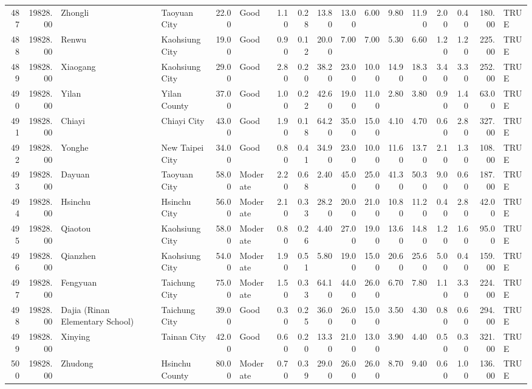\begin{table}[ht]
\begin{tabular}{rrllrlrrrrrrrrrrl}
  487 & 19828.00 & Zhongli & Taoyuan City & 22.00 & Good & 1.10 & 0.28 & 13.80 & 13.00 & 6.00 & 9.80 & 11.90 & 2.00 & 0.40 & 180.00 & TRUE \\ 
  488 & 19828.00 & Renwu & Kaohsiung City & 19.00 & Good & 0.90 & 0.12 & 20.00 & 7.00 & 7.00 & 5.30 & 6.60 & 1.20 & 1.20 & 225.00 & TRUE \\ 
  489 & 19828.00 & Xiaogang & Kaohsiung City & 29.00 & Good & 2.80 & 0.20 & 38.20 & 23.00 & 10.00 & 14.90 & 18.30 & 3.40 & 3.30 & 252.00 & TRUE \\ 
  490 & 19828.00 & Yilan & Yilan County & 37.00 & Good & 1.00 & 0.22 & 42.60 & 19.00 & 11.00 & 2.80 & 3.80 & 0.90 & 1.40 & 63.00 & TRUE \\ 
  491 & 19828.00 & Chiayi & Chiayi City & 43.00 & Good & 1.90 & 0.18 & 64.20 & 35.00 & 15.00 & 4.10 & 4.70 & 0.60 & 2.80 & 327.00 & TRUE \\ 
  492 & 19828.00 & Yonghe & New Taipei City & 34.00 & Good & 0.80 & 0.41 & 34.90 & 23.00 & 10.00 & 11.60 & 13.70 & 2.10 & 1.30 & 108.00 & TRUE \\ 
  493 & 19828.00 & Dayuan & Taoyuan City & 58.00 & Moderate & 2.20 & 0.68 & 2.40 & 45.00 & 25.00 & 41.30 & 50.30 & 9.00 & 0.60 & 187.00 & TRUE \\ 
  494 & 19828.00 & Hsinchu & Hsinchu City & 56.00 & Moderate & 2.10 & 0.33 & 28.20 & 20.00 & 21.00 & 10.80 & 11.20 & 0.40 & 2.80 & 42.00 & TRUE \\ 
  495 & 19828.00 & Qiaotou & Kaohsiung City & 58.00 & Moderate & 0.80 & 0.26 & 4.40 & 27.00 & 19.00 & 13.60 & 14.80 & 1.20 & 1.60 & 95.00 & TRUE \\ 
  496 & 19828.00 & Qianzhen & Kaohsiung City & 54.00 & Moderate & 1.90 & 0.51 & 5.80 & 19.00 & 15.00 & 20.60 & 25.60 & 5.00 & 0.40 & 159.00 & TRUE \\ 
  497 & 19828.00 & Fengyuan & Taichung City & 75.00 & Moderate & 1.50 & 0.33 & 64.10 & 44.00 & 26.00 & 6.70 & 7.80 & 1.10 & 3.30 & 224.00 & TRUE \\ 
  498 & 19828.00 & Dajia (Rinan Elementary School) & Taichung City & 39.00 & Good & 0.30 & 0.25 & 36.00 & 26.00 & 15.00 & 3.50 & 4.30 & 0.80 & 0.60 & 294.00 & TRUE \\ 
  499 & 19828.00 & Xinying & Tainan City & 42.00 & Good & 0.60 & 0.20 & 13.30 & 21.00 & 13.00 & 3.90 & 4.40 & 0.50 & 0.30 & 321.00 & TRUE \\ 
  500 & 19828.00 & Zhudong & Hsinchu County & 80.00 & Moderate & 0.70 & 0.39 & 29.00 & 26.00 & 26.00 & 8.70 & 9.40 & 0.60 & 1.00 & 136.00 & TRUE \\ 

\end{tabular}
\end{table}
